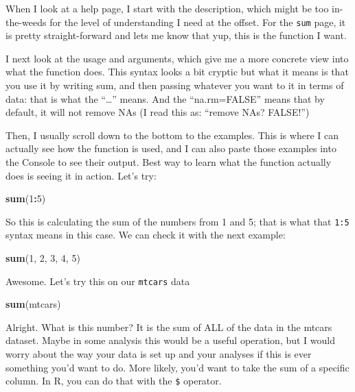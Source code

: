 \documentclass[]{book}
\newenvironment{Shaded}{\begin{snugshade}}{\end{snugshade}}
\newcommand{\DecValTok}[1]{\textcolor[rgb]{0.00,0.00,0.81}{#1}}
\newcommand{\KeywordTok}[1]{\textcolor[rgb]{0.13,0.29,0.53}{\textbf{#1}}}
\newcommand{\NormalTok}[1]{#1}
\newcommand{\OperatorTok}[1]{\textcolor[rgb]{0.81,0.36,0.00}{\textbf{#1}}}
\begin{document}
When I look at a help page, I start with the description, which might be too in-the-weeds for the level of understanding I need at the offset. For the \texttt{sum} page, it is pretty straight-forward and lets me know that yup, this is the function I want.

I next look at the usage and arguments, which give me a more concrete view into what the function does. This syntax looks a bit cryptic but what it means is that you use it by writing sum, and then passing whatever you want to it in terms of data: that is what the ``\ldots{}'' means. And the ``na.rm=FALSE'' means that by default, it will not remove NAs (I read this as: ``remove NAs? FALSE!'')

Then, I usually scroll down to the bottom to the examples. This is where I can actually see how the function is used, and I can also paste those examples into the Console to see their output. Best way to learn what the function actually does is seeing it in action. Let's try:

\begin{Shaded}
\begin{Highlighting}[]
\KeywordTok{sum}\NormalTok{(}\DecValTok{1}\OperatorTok{:}\DecValTok{5}\NormalTok{)}
\end{Highlighting}
\end{Shaded}

So this is calculating the sum of the numbers from 1 and 5; that is what that \texttt{1:5} syntax means in this case. We can check it with the next example:

\begin{Shaded}
\begin{Highlighting}[]
\KeywordTok{sum}\NormalTok{(}\DecValTok{1}\NormalTok{, }\DecValTok{2}\NormalTok{, }\DecValTok{3}\NormalTok{, }\DecValTok{4}\NormalTok{, }\DecValTok{5}\NormalTok{)}
\end{Highlighting}
\end{Shaded}

Awesome. Let's try this on our \texttt{mtcars} data

\begin{Shaded}
\begin{Highlighting}[]
\KeywordTok{sum}\NormalTok{(mtcars)}
\end{Highlighting}
\end{Shaded}

Alright. What is this number? It is the sum of ALL of the data in the mtcars dataset. Maybe in some analysis this would be a useful operation, but I would worry about the way your data is set up and your analyses if this is ever something you'd want to do. More likely, you'd want to take the sum of a specific column. In R, you can do that with the \texttt{\$} operator.
\end{document}
